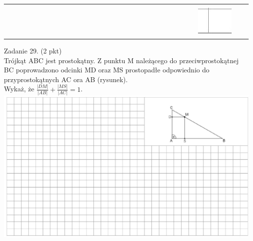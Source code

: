 \documentclass[10pt]{article}
\begin{document}
\begin{center}
\begin{tabular}{|c|c|c|c|c|c|c|c|c|c|c|c|c|c|c|c|c|c|c|c|c|c|c|c|c|c|c|c|c|c|c|}
\hline
 &  &  &  &  &  &  &  &  &  &  &  &  &  &  &  &  &  &  &  &  &  &  &  &  &  &  &  &  &  &  \\
\hline
 &  &  &  &  &  &  &  &  &  &  &  &  &  &  &  &  &  &  &  &  &  &  &  &  &  &  &  &  &  &  \\
\hline
 &  &  &  &  &  &  &  &  &  &  &  &  &  &  &  &  &  &  &  &  &  &  &  &  &  &  &  & \includegraphics[max width=\textwidth]{2024_11_21_0fa17f80dfe1c6bd3b66g-09}
 &  &  \\
\hline
\end{tabular}
\end{center}

Zadanie 29. (2 pkt)\\
Trójkąt ABC jest prostokątny. Z punktu M należącego do przeciwprostokątnej BC poprowadzono odcinki MD oraz MS prostopadłe odpowiednio do przyprostokątnych AC ora AB (rysunek).\\
Wykaż, że \(\frac{|D M|}{|A B|}+\frac{|M S|}{|A C|}=1\).\\
\includegraphics[max width=\textwidth, center]{2024_11_21_0fa17f80dfe1c6bd3b66g-09(1)}
\end{document}
